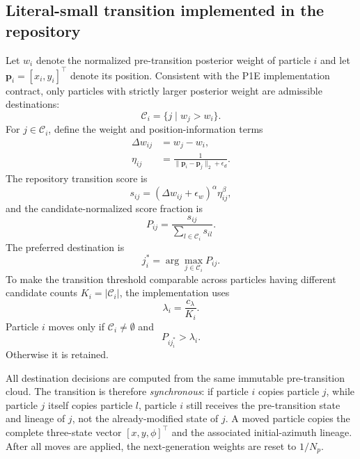 \subsection{Literal-small transition implemented in the repository}
Let $w_i$ denote the normalized pre-transition posterior weight of particle $i$ and let $\bm p_i=[x_i,y_i]^\top$ denote its position. Consistent with the P1E implementation contract, only particles with strictly larger posterior weight are admissible destinations:
\begin{equation}
    \mathcal C_i=\{j\mid w_j>w_i\}.
\end{equation}
For $j\in\mathcal C_i$, define the weight and position-information terms
\begin{align}
    \Delta w_{ij}&=w_j-w_i,\\
    \eta_{ij}&=\frac{1}{\lVert\bm p_i-\bm p_j\rVert_2+\epsilon_d}.
\end{align}
The repository transition score is
\begin{equation}
    s_{ij}=(\Delta w_{ij}+\epsilon_w)^\alpha\eta_{ij}^{\beta},
\end{equation}
and the candidate-normalized score fraction is
\begin{equation}
    P_{ij}=\frac{s_{ij}}{\sum_{l\in\mathcal C_i}s_{il}}.
\end{equation}
The preferred destination is
\begin{equation}
    j_i^*=\arg\max_{j\in\mathcal C_i}P_{ij}.
\end{equation}
To make the transition threshold comparable across particles having different candidate counts $K_i=|\mathcal C_i|$, the implementation uses
\begin{equation}
    \lambda_i=\frac{c_\lambda}{K_i}.
\end{equation}
Particle $i$ moves only if $\mathcal C_i\neq\emptyset$ and
\begin{equation}
    P_{i j_i^*}>\lambda_i.
\end{equation}
Otherwise it is retained.

All destination decisions are computed from the same immutable pre-transition cloud. The transition is therefore \emph{synchronous}: if particle $i$ copies particle $j$, while particle $j$ itself copies particle $l$, particle $i$ still receives the pre-transition state and lineage of $j$, not the already-modified state of $j$. A moved particle copies the complete three-state vector $[x,y,\phi]^\top$ and the associated initial-azimuth lineage. After all moves are applied, the next-generation weights are reset to $1/N_p$.

